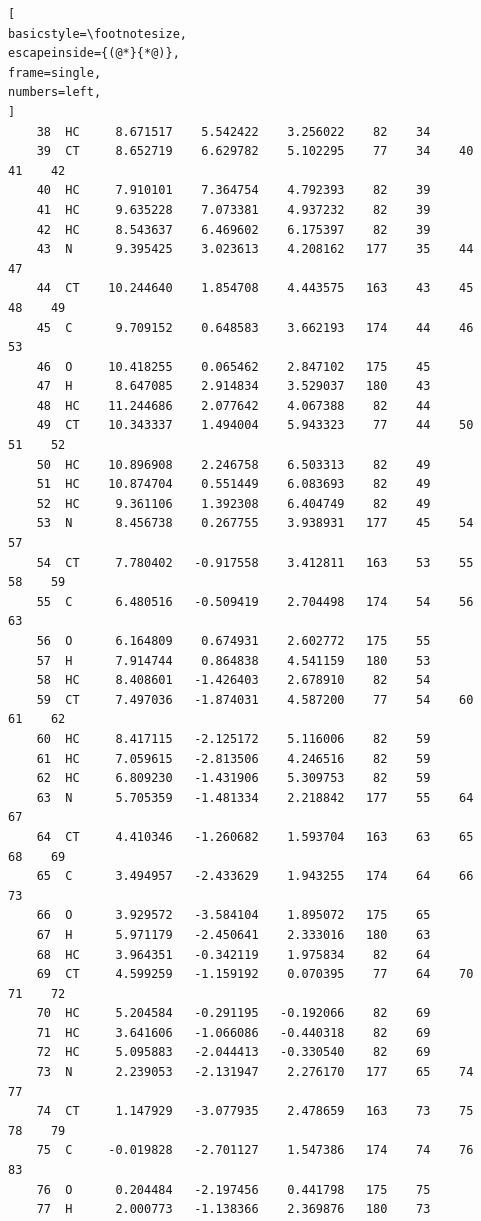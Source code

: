 \documentclass[a4paper,11pt]{scrartcl}
\begin{document}
\begin{lstlisting}[
basicstyle=\footnotesize,
escapeinside={(@*}{*@)},
frame=single,
numbers=left,
]
    38  HC     8.671517    5.542422    3.256022    82    34
    39  CT     8.652719    6.629782    5.102295    77    34    40    41    42
    40  HC     7.910101    7.364754    4.792393    82    39
    41  HC     9.635228    7.073381    4.937232    82    39
    42  HC     8.543637    6.469602    6.175397    82    39
    43  N      9.395425    3.023613    4.208162   177    35    44    47
    44  CT    10.244640    1.854708    4.443575   163    43    45    48    49
    45  C      9.709152    0.648583    3.662193   174    44    46    53
    46  O     10.418255    0.065462    2.847102   175    45
    47  H      8.647085    2.914834    3.529037   180    43
    48  HC    11.244686    2.077642    4.067388    82    44
    49  CT    10.343337    1.494004    5.943323    77    44    50    51    52
    50  HC    10.896908    2.246758    6.503313    82    49
    51  HC    10.874704    0.551449    6.083693    82    49
    52  HC     9.361106    1.392308    6.404749    82    49
    53  N      8.456738    0.267755    3.938931   177    45    54    57
    54  CT     7.780402   -0.917558    3.412811   163    53    55    58    59
    55  C      6.480516   -0.509419    2.704498   174    54    56    63
    56  O      6.164809    0.674931    2.602772   175    55
    57  H      7.914744    0.864838    4.541159   180    53
    58  HC     8.408601   -1.426403    2.678910    82    54
    59  CT     7.497036   -1.874031    4.587200    77    54    60    61    62
    60  HC     8.417115   -2.125172    5.116006    82    59
    61  HC     7.059615   -2.813506    4.246516    82    59
    62  HC     6.809230   -1.431906    5.309753    82    59
    63  N      5.705359   -1.481334    2.218842   177    55    64    67
    64  CT     4.410346   -1.260682    1.593704   163    63    65    68    69
    65  C      3.494957   -2.433629    1.943255   174    64    66    73
    66  O      3.929572   -3.584104    1.895072   175    65
    67  H      5.971179   -2.450641    2.333016   180    63
    68  HC     3.964351   -0.342119    1.975834    82    64
    69  CT     4.599259   -1.159192    0.070395    77    64    70    71    72
    70  HC     5.204584   -0.291195   -0.192066    82    69
    71  HC     3.641606   -1.066086   -0.440318    82    69
    72  HC     5.095883   -2.044413   -0.330540    82    69
    73  N      2.239053   -2.131947    2.276170   177    65    74    77
    74  CT     1.147929   -3.077935    2.478659   163    73    75    78    79
    75  C     -0.019828   -2.701127    1.547386   174    74    76    83
    76  O      0.204484   -2.197456    0.441798   175    75
    77  H      2.000773   -1.138366    2.369876   180    73

\end{lstlisting}
\end{document}
